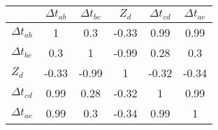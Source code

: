 \begin{tabular}{|l|c|c|c|c|c|}
\hline
&\textbf{$\Delta{t}_{ab}$}&\textbf{$\Delta{t}_{bc}$}&\textbf{$Z_d$}&\textbf{$\Delta{t}_{cd}$}&\textbf{$\Delta{t}_{ae}$}\\\hline
\textbf{$\Delta{t}_{ab}$}&1&0.3&-0.33&0.99&0.99\\\hline
\textbf{$\Delta{t}_{bc}$}&0.3&1&-0.99&0.28&0.3\\\hline
\textbf{$Z_d$}&-0.33&-0.99&1&-0.32&-0.34\\\hline
\textbf{$\Delta{t}_{cd}$}&0.99&0.28&-0.32&1&0.99\\\hline
\textbf{$\Delta{t}_{ae}$}&0.99&0.3&-0.34&0.99&1\\\hline
\end{tabular}
